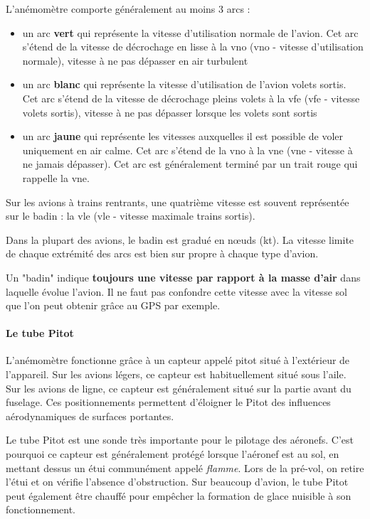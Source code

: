 	L'anémomètre comporte généralement au moins 3 arcs :
	\begin{itemize}
		\item un arc \textbf{vert} qui représente la vitesse d'utilisation normale de l'avion. Cet arc s'étend de la vitesse de décrochage en lisse à la \acrshort{vno} (\acrlong{vno} - vitesse d'utilisation normale), vitesse à ne pas dépasser en air turbulent
		\item un arc \textbf{blanc} qui représente la vitesse d'utilisation de l'avion volets sortis. Cet arc s'étend de la vitesse de décrochage pleins volets à la \acrshort{vfe} (\acrlong{vfe} - vitesse volets sortis), vitesse à ne pas dépasser lorsque les volets sont sortis
		\item un arc \textbf{jaune} qui représente les vitesses auxquelles il est possible de voler uniquement en air calme. Cet arc s'étend de la \acrshort{vno} à la \acrshort{vne} (\acrlong{vne} - vitesse à ne jamais dépasser). Cet arc est généralement terminé par un trait rouge qui rappelle la \acrshort{vne}.
	\end{itemize}
	
	Sur les avions à trains rentrants, une quatrième vitesse est souvent représentée sur le badin : la \acrshort{vle} (\acrlong{vle} - vitesse maximale trains sortis).
	
	Dans la plupart des avions, le badin est gradué en nœuds (kt). La vitesse limite de chaque extrémité des arcs est bien sur propre à chaque type d'avion.
	
	\alert{Un "badin" indique \textbf{toujours une vitesse par rapport à la masse d'air} dans laquelle évolue l'avion. Il ne faut pas confondre cette vitesse avec la vitesse sol que l'on peut obtenir grâce au GPS par exemple.}
	
	\paragraph{Le tube Pitot}
	
	L'anémomètre fonctionne grâce à un capteur appelé \gls{pitot} situé à l'extérieur de l'appareil. Sur les avions légers, ce capteur est habituellement situé sous l'aile. Sur les avions de ligne, ce capteur est généralement situé sur la partie avant du fuselage. Ces positionnements permettent d'éloigner le Pitot des influences aérodynamiques de surfaces portantes.
	
	Le tube Pitot est une sonde très importante pour le pilotage des aéronefs. C'est pourquoi ce capteur est généralement protégé lorsque l'aéronef est au sol, en mettant dessus un étui communément appelé \textit{flamme}. Lors de la pré-vol, on retire l'étui et on vérifie l'absence d'obstruction. Sur beaucoup d'avion, le tube Pitot peut également être chauffé pour empêcher la formation de glace nuisible à son fonctionnement.
	
